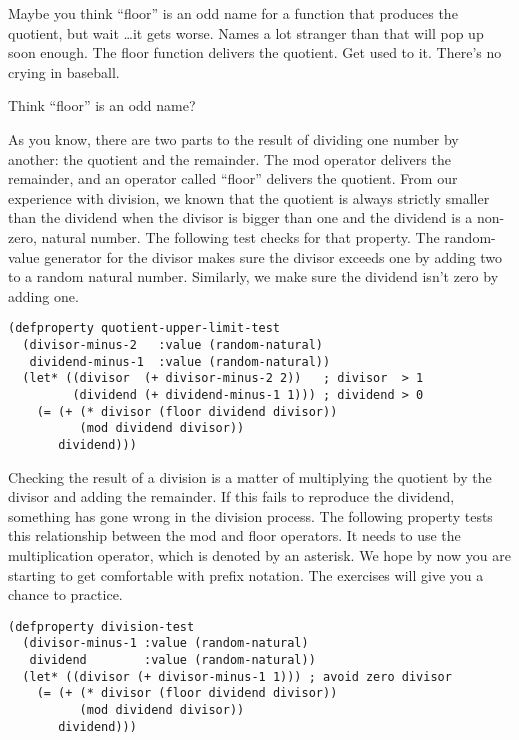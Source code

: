 \begin{aside}
Maybe you think ``floor'' is an odd name
for a function that produces the quotient, but wait \dots it gets worse.
Names a lot stranger than that will pop up soon enough.
The floor function delivers the quotient. Get used to it.
There's no crying in baseball.
\caption{Think ``floor'' is an odd name?}
\label{floor-is-odd}
\end{aside}

As you know, there are two parts to the result
of dividing one number by another: the quotient and the remainder.
The mod operator delivers the remainder,
\label{floor-def}
and an operator called ``floor'' delivers the quotient.
From our experience with division, we known
that the quotient is always strictly smaller
than the dividend when the divisor is bigger than one
and the dividend is a non-zero, natural number.
The following test checks for that property.
The random-value generator for the divisor
makes sure the divisor exceeds one by adding two
to a random natural number.
Similarly, we make sure the dividend isn't zero by adding one.

\label{quotient-upper-limit-test}
\begin{lstlisting}
(defproperty quotient-upper-limit-test
  (divisor-minus-2   :value (random-natural)
   dividend-minus-1  :value (random-natural))
  (let* ((divisor  (+ divisor-minus-2 2))   ; divisor  > 1
         (dividend (+ dividend-minus-1 1))) ; dividend > 0
    (= (+ (* divisor (floor dividend divisor))
          (mod dividend divisor))
       dividend)))
\end{lstlisting}

Checking the result of a division is a matter
of multiplying the quotient by the divisor and adding the remainder.
If this fails to reproduce the dividend,
something has gone wrong in the division process.
The following property tests this relationship
between the mod and floor operators.
It needs to use the multiplication operator, which is denoted by an asterisk.
We hope by now you are starting to get comfortable with prefix notation.
The exercises will give you a chance to practice.

\label{division-test}
\begin{lstlisting}
(defproperty division-test
  (divisor-minus-1 :value (random-natural)
   dividend        :value (random-natural))
  (let* ((divisor (+ divisor-minus-1 1))) ; avoid zero divisor
    (= (+ (* divisor (floor dividend divisor))
          (mod dividend divisor))
       dividend)))
\end{lstlisting}

